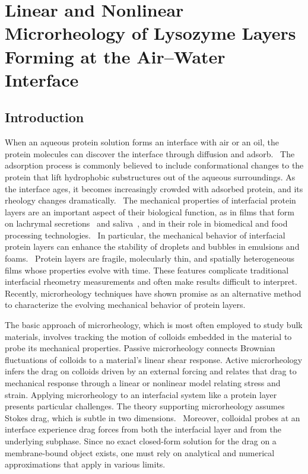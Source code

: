 \chapter{Linear and Nonlinear Microrheology of Lysozyme Layers Forming at the Air--Water Interface}

\section{\label{sec:introduction}Introduction}

When an aqueous protein solution forms an interface with air or an oil, the protein molecules can discover the interface through diffusion and adsorb.~\cite{Walder2011}  The adsorption process is commonly believed to include conformational changes to the protein that lift hydrophobic substructures out of the aqueous surroundings. As the interface ages, it becomes increasingly crowded with adsorbed protein, and its rheology changes dramatically.~\cite{Murray2011a}
The mechanical properties of interfacial protein layers are an important aspect of their biological function, as in films that form on lachrymal secretions~\cite{Rosenfeld2013} and saliva~\cite{Proctor2005}, and in their role in biomedical and food processing technologies.~\cite{Murray2002}  In particular, the mechanical behavior of interfacial protein layers can enhance the stability of droplets and bubbles in emulsions and foams.~\cite{SaintJalmes2005219,McClements2004305}
Protein layers are fragile, molecularly thin, and spatially heterogeneous films whose properties evolve with time. These features complicate traditional interfacial rheometry measurements and often make results difficult to interpret.  Recently, microrheology techniques have shown promise as an alternative method to characterize the evolving mechanical behavior of protein layers.  

The basic approach of microrheology, which is most often employed to study bulk materials, involves tracking the motion of colloids embedded in the material to probe its mechanical properties.  Passive microrheology connects Brownian fluctuations of colloids to a material's linear shear response. Active microrheology infers the drag on colloids driven by an external forcing and relates that drag to mechanical response through a linear or nonlinear model relating stress and strain.
Applying microrheology to an interfacial system like a protein layer presents particular challenges. The theory supporting microrheology assumes Stokes drag, which is subtle in two dimensions.~\cite{Saffman1975} Moreover, colloidal probes at an interface experience drag forces from both the interfacial layer and from the underlying subphase. Since no exact closed-form solution for the drag on a membrane-bound object exists, one must rely on analytical and numerical approximations that apply in various limits.~\cite{Hughes1982,Fischer2006,Sickert2007,Petrov2008,Levine2004a}

